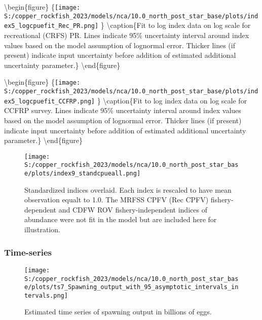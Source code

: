 \documentclass[11pt,
  letterpaper,
]{article}
\begin{document}
\pagebreak

\textbackslash begin\{figure\} \{\centering \texttt{[image: S:/copper\_rockfish\_2023/models/nca/10.0\_north\_post\_star\_base/plots/index5\_logcpuefit\_Rec\_PR.png]} \} \textbackslash caption\{Fit to log index data on log scale for recreational (CRFS) PR. Lines indicate 95\% uncertainty interval around index values based on the model assumption of lognormal error. Thicker lines (if present) indicate input uncertainty before addition of estimated additional uncertainty parameter.\label{fig:crfs-pr-index-fit}\} \textbackslash end\{figure\}

\FloatBarrier

\pagebreak

\textbackslash begin\{figure\} \{\centering \texttt{[image: S:/copper\_rockfish\_2023/models/nca/10.0\_north\_post\_star\_base/plots/index5\_logcpuefit\_CCFRP.png]} \} \textbackslash caption\{Fit to log index data on log scale for CCFRP survey. Lines indicate 95\% uncertainty interval around index values based on the model assumption of lognormal error. Thicker lines (if present) indicate input uncertainty before addition of estimated additional uncertainty parameter.\label{fig:ccfrp-index-fit}\} \textbackslash end\{figure\}

\begin{figure}
{\centering
\texttt{[image: S:/copper\_rockfish\_2023/models/nca/10.0\_north\_post\_star\_base/plots/index9\_standcpueall.png]}
}
\caption{Standardized indices overlaid. Each index is rescaled to have mean observation equalt to 1.0. The  MRFSS CPFV (Rec CPFV) fishery-dependent and CDFW ROV fishery-independent indices of abundance were not fit in the model but are included here for illustration.\label{fig:standardized-indices}}
\end{figure}

\subsubsection{Time-series}\label{time-series}

\begin{figure}
{\centering
\texttt{[image: S:/copper\_rockfish\_2023/models/nca/10.0\_north\_post\_star\_base/plots/ts7\_Spawning\_output\_with\_95\_asymptotic\_intervals\_intervals.png]}
}
\caption{Estimated time series of spawning output in billions of eggs.\label{fig:ssb}}
\end{figure}
\end{document}
